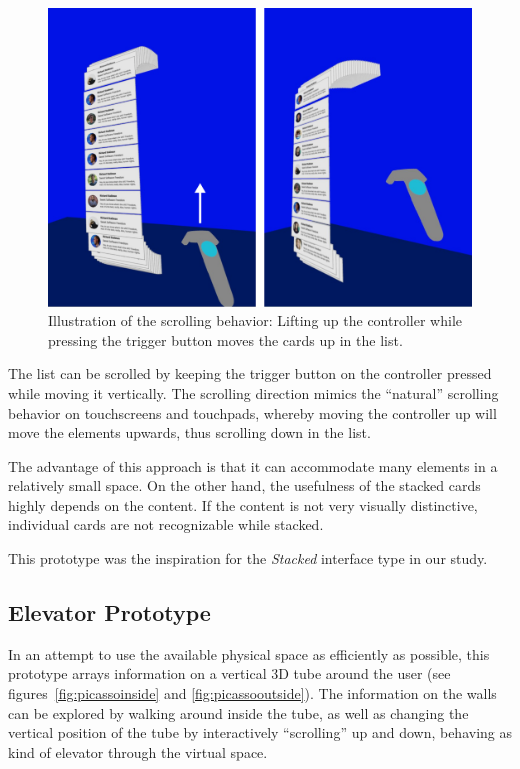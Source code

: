 \documentclass[nobib]{tufte-book} %
\begin{document}
\begin{figure}
  \includegraphics{emailscroll.png}
  \caption{Illustration of the scrolling behavior: Lifting up the controller while pressing the trigger button moves the cards up in the list.}
  \label{fig:emailscroll}
\end{figure}

The list can be scrolled by keeping the trigger button on the controller pressed while moving it vertically. The scrolling direction mimics the ``natural'' scrolling behavior on touchscreens and touchpads, whereby moving the controller up will move the elements upwards, thus scrolling down in the list.

The advantage of this approach is that it can accommodate many elements in a relatively small space. On the other hand, the usefulness of the stacked cards highly depends on the content. If the content is not very visually distinctive, individual cards are not recognizable while stacked.

This prototype was the inspiration for the \emph{Stacked} interface type in our study.

\subsection{Elevator Prototype}
In an attempt to use the available physical space as efficiently as possible, this prototype arrays information on a vertical 3D tube around the user (see figures~\ref{fig:picassoinside} and \ref{fig:picassooutside}). The information on the walls can be explored by walking around inside the tube, as well as changing the vertical position of the tube by interactively ``scrolling'' up and down, behaving as kind of elevator through the virtual space.
\end{document}
